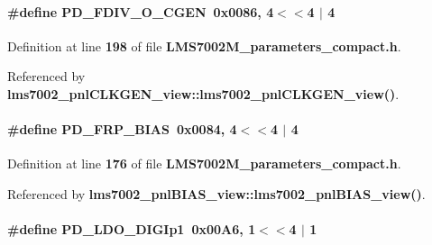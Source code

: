 \paragraph[{P\+D\+\_\+\+F\+D\+I\+V\+\_\+\+O\+\_\+\+C\+G\+EN}]{\setlength{\rightskip}{0pt plus 5cm}\#define P\+D\+\_\+\+F\+D\+I\+V\+\_\+\+O\+\_\+\+C\+G\+EN~0x0086, 4$<$$<$4 $\vert$  4}\label{LMS7002M__parameters__compact_8h_a50817e7daca2c29bd98f7d98b400b082}


Definition at line {\bf 198} of file {\bf L\+M\+S7002\+M\+\_\+parameters\+\_\+compact.\+h}.



Referenced by {\bf lms7002\+\_\+pnl\+C\+L\+K\+G\+E\+N\+\_\+view\+::lms7002\+\_\+pnl\+C\+L\+K\+G\+E\+N\+\_\+view()}.

\paragraph[{P\+D\+\_\+\+F\+R\+P\+\_\+\+B\+I\+AS}]{\setlength{\rightskip}{0pt plus 5cm}\#define P\+D\+\_\+\+F\+R\+P\+\_\+\+B\+I\+AS~0x0084, 4$<$$<$4 $\vert$  4}\label{LMS7002M__parameters__compact_8h_ae206dfa8eeb5473f027502c4e1d111ea}


Definition at line {\bf 176} of file {\bf L\+M\+S7002\+M\+\_\+parameters\+\_\+compact.\+h}.



Referenced by {\bf lms7002\+\_\+pnl\+B\+I\+A\+S\+\_\+view\+::lms7002\+\_\+pnl\+B\+I\+A\+S\+\_\+view()}.

\paragraph[{P\+D\+\_\+\+L\+D\+O\+\_\+\+D\+I\+G\+Ip1}]{\setlength{\rightskip}{0pt plus 5cm}\#define P\+D\+\_\+\+L\+D\+O\+\_\+\+D\+I\+G\+Ip1~0x00\+A6, 1$<$$<$4 $\vert$  1}\label{LMS7002M__parameters__compact_8h_a6882cdba3f200b0d08b378a9745d2634}


